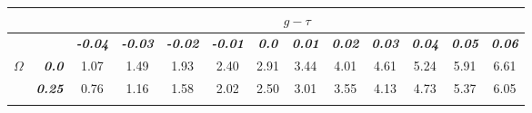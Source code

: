\documentclass[]{article}
\begin{document}
\begin{table}[h]
\setlength{\tabcolsep}{3pt}
\begin{tabular}{lrccccccccccc}
\hline
                                                         & \multicolumn{1}{l}{}  & \multicolumn{11}{c}{\large{\textbf{$g-\tau$}}}                                                                                                                                                                                                                                                                                                                                                                                                                                                            \\ \hline
\multicolumn{1}{l}{}                                    & \multicolumn{1}{l}{}  & \multicolumn{1}{c}{\textit{\textbf{-0.04}}} & \multicolumn{1}{c}{\textit{\textbf{-0.03}}} & \multicolumn{1}{c}{\textit{\textbf{-0.02}}} & \multicolumn{1}{c}{\textit{\textbf{-0.01}}} & \multicolumn{1}{c}{\textit{\textbf{0.0}}} & \multicolumn{1}{c}{\textit{\textbf{0.01}}} & \multicolumn{1}{c}{\textit{\textbf{0.02}}} & \multicolumn{1}{c}{\textit{\textbf{0.03}}} & \multicolumn{1}{c}{\textit{\textbf{0.04}}} & \multicolumn{1}{c}{\textit{\textbf{0.05}}} & \textit{\textbf{0.06}} \\ \hline
\multicolumn{1}{l}{\multirow{5}{*}{\large{\textbf{$\Omega$}}}} & \textit{\textbf{0.0}}  & \multicolumn{1}{c}{1.07}                    & \multicolumn{1}{c}{1.49}                    & \multicolumn{1}{c}{1.93}                    & \multicolumn{1}{c}{2.40}                    & \multicolumn{1}{c}{2.91}                & \multicolumn{1}{c}{3.44}                   & \multicolumn{1}{c}{4.01}                   & \multicolumn{1}{c}{4.61}                   & \multicolumn{1}{c}{5.24}                   & \multicolumn{1}{c}{5.91}                   & 6.61                   \\ \cline{2-13} 
\multicolumn{1}{l}{}                                   & \textit{\textbf{0.25}} & \multicolumn{1}{c}{0.76}                    & \multicolumn{1}{c}{1.16}                    & \multicolumn{1}{c}{1.58}                    & \multicolumn{1}{c}{2.02}                    & \multicolumn{1}{c}{2.50}                & \multicolumn{1}{c}{3.01}                   & \multicolumn{1}{c}{3.55}                   & \multicolumn{1}{c}{4.13}                   & \multicolumn{1}{c}{4.73}                   & \multicolumn{1}{c}{5.37}                   & 6.05                   \\ \cline{2-13} 

\end{tabular}
\end{table}
\end{document}
